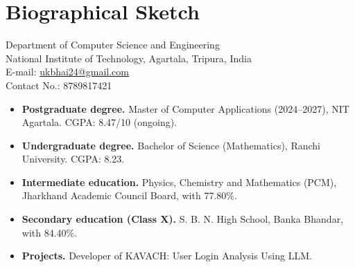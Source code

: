 \chapter{Biographical Sketch}
\begin{center}
{\large\bfseries\CandidateName}\par
\vspace{0.3cm}
Department of Computer Science and Engineering\\
National Institute of Technology, Agartala, Tripura, India\\
E-mail: \href{mailto:ukbhai24@gmail.com}{ukbhai24@gmail.com}\\
Contact No.: 8789817421
\end{center}
\vspace{0.2cm}
\begingroup\renewcommand{\labelitemi}{\(\bullet\)}
\begin{itemize}
\setlength{\itemsep}{5pt}
\setlength{\parskip}{0pt}
\item \textbf{Postgraduate degree.} Master of Computer Applications (2024--2027), NIT Agartala. CGPA: 8.47/10 (ongoing).
\item \textbf{Undergraduate degree.} Bachelor of Science (Mathematics), Ranchi University. CGPA: 8.23.
\item \textbf{Intermediate education.} Physics, Chemistry and Mathematics (PCM), Jharkhand Academic Council Board, with 77.80\%.
\item \textbf{Secondary education (Class X).} S. B. N. High School, Banka Bhandar, with 84.40\%.
\item \textbf{Projects.} Developer of KAVACH: User Login Analysis Using LLM.
\end{itemize}
\endgroup

